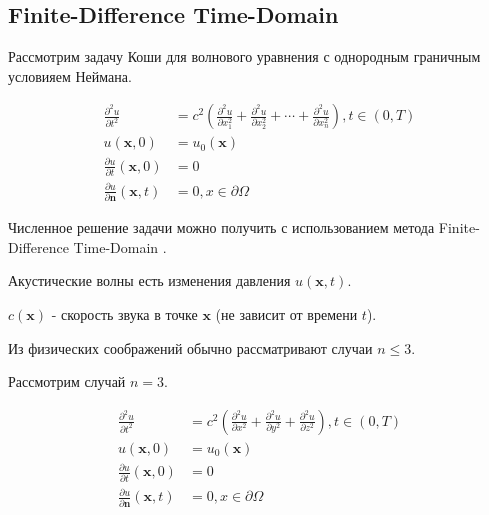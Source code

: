 \subsection{Finite-Difference Time-Domain}

Рассмотрим задачу Коши для волнового уравнения
с однородным граничным условияем Неймана.

\begin{align*}
    \frac{\partial^2 u}{\partial t^2}
    &=
    c^2
    \left(
    \frac{\partial^2 u}{\partial x_1^2}
    + \frac{\partial^2 u}{\partial x_2^2}
    + \cdots
    + \frac{\partial^2 u}{\partial x_n^2}
    \right)
    ,
    t \in \left( 0, T \right)
    \\
    u \left( \mathbf{x}, 0 \right) &= u_0 \left( \mathbf{x} \right) \\
    \frac{\partial u}{\partial t} \left( \mathbf{x}, 0 \right) &= 0 \\
    \frac{\partial u}{\partial \mathbf{n}} \left( \mathbf{x}, t \right) &= 0
    ,
    x \in \partial \Omega
\end{align*}

Численное решение задачи можно получить
с использованием метода Finite-Difference Time-Domain
\cite{understanding_the_finite-difference_time-domain_method}.

Акустические волны есть изменения давления
\( u \left( \mathbf{x}, t \right) \).

\( c \left( \mathbf{x} \right) \)
- скорость звука в точке \( \mathbf{x} \) (не зависит от времени \( t \)).

Из физических соображений обычно рассматривают случаи \( n \le 3 \).

Рассмотрим случай \( n = 3 \).

\begin{align*}
    \frac{\partial^2 u}{\partial t^2}
    &=
    c^2
    \left(
        \frac{\partial^2 u}{\partial x^2}
        + \frac{\partial^2 u}{\partial y^2}
        + \frac{\partial^2 u}{\partial z^2}
    \right)
    ,
    t \in \left( 0, T \right)
    \\
    u \left( \mathbf{x}, 0 \right) &= u_0 \left( \mathbf{x} \right) \\
    \frac{\partial u}{\partial t} \left( \mathbf{x}, 0 \right) &= 0 \\
    \frac{\partial u}{\partial \mathbf{n}} \left( \mathbf{x} , t \right) &= 0
    ,
    x \in \partial \Omega
    \\
\end{align*}


